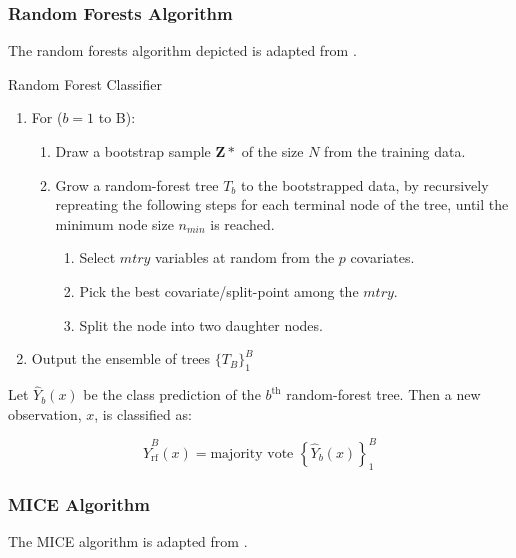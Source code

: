 \documentclass[12pt,]{article}
\begin{document}
\subsubsection{Random Forests Algorithm}\label{random-forests-algorithm}

The random forests algorithm depicted is adapted from
\citep{hastie_elements_2009}.

\begin{algorithm}[H]

\caption{Random Forest Classifier}
\DontPrintSemicolon
\SetAlgoLined
\BlankLine

\begin{enumerate}
  \item For ($b=1$ to B):
    \begin{enumerate}
      \item Draw a bootstrap sample $\mathbf{Z*}$ of the size $N$ from the training data.
      \item Grow a random-forest tree $T_b$ to the bootstrapped data, by recursively repreating the following steps for each terminal node of the tree, until the minimum node size $n_{min}$ is reached.
      \begin{enumerate}
        \item Select $mtry$ variables at random from the $p$ covariates. 
        \item Pick the best covariate/split-point among the $mtry$. 
        \item Split the node into two daughter nodes. 
      \end{enumerate}
    \end{enumerate}
  \item Output the ensemble of trees $\{T_B\}^B_1$
\end{enumerate}
\BlankLine

Let $\hat{Y}_b(x)$ be the class prediction of the $b^{\text{th}}$ random-forest tree.  Then a new observation, $x$, is classified as:

$$\hat{Y}^B_{\text{rf}}(x) = \text{majority vote } \left\{ \hat{Y}_b(x) \right\}^B_1$$

\end{algorithm}

\subsubsection{MICE Algorithm}\label{mice-algorithm}

The MICE algorithm is adapted from \citep{van_buuren_flexible_2012}.
\end{document}

